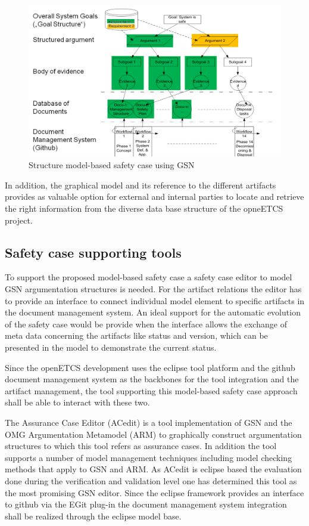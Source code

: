\documentclass{template/openetcs_report}
\begin{document}
\begin{figure}[htbp]
\centering
\includegraphics[width=0.9\linewidth]{./images/Structure-SC-GSN}
\caption{Structure model-based safety case using GSN}
\label{fig:GSN-SafetyCase}
\end{figure}

 In addition, the graphical model and its reference to the different artifacts provides as valuable option for external and internal parties to locate and retrieve the right information from the diverse data base structure of the opneETCS project.

\subsection{Safety case supporting tools}

To support the proposed model-based safety case a safety case editor to model GSN argumentation structures is needed. For the artifact relations the editor has to provide an interface to connect individual model element to specific artifacts in the document management system. An ideal support for the automatic evolution of the safety case would be provide when the interface allows the exchange of meta data concerning the artifacts like status and version, which can be presented in the model to demonstrate the current status.

Since the openETCS development uses the eclipse tool platform and the github document management system as the backbones for the tool integration and the artifact management, the tool supporting this model-based safety case approach shall be able to interact with these two. 

The Assurance Case Editor (ACedit) \cite{aceditwebsite} is a tool implementation of GSN \cite{GSNwebsite} and the OMG Argumentation  Metamodel  (ARM) \cite{ARMwebsite} to graphically construct argumentation structures to which this tool refers as assurance cases. In addition the tool supports a number of model management techniques including model checking methods that apply to GSN and ARM. As ACedit is eclipse based the evaluation done during the verification and validation level one has determined this tool as the most promising GSN editor. Since the eclipse framework provides an interface to github via the EGit plug-in the document management system integration shall be realized through the eclipse model base.
\end{document}
